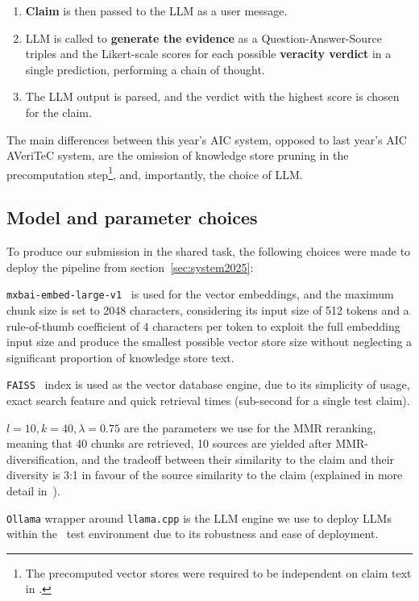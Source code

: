 \begin{enumerate}[i.]
\begin{enumerate}[1.]
        \item \textbf{Claim} is then passed to the LLM as a user message.
        \item LLM is called to \textbf{generate the evidence} as a Question-Answer-Source triples and the Likert-scale scores for each possible \textbf{veracity verdict} in a single prediction, performing a chain of thought. 
        \item The LLM output is parsed, and the verdict with the highest score is chosen for the claim.
    \end{enumerate}
\end{enumerate}

The main differences between this year's AIC \averitec{} system, opposed to last year's AIC AVeriTeC system, are the omission of knowledge store pruning in the precomputation step\footnote{The precomputed vector stores were required to be independent on claim text in \averitec{}.}, and, importantly, the choice of LLM.
\subsection{Model and parameter choices}
\label{sec:choices}
To produce our submission in the \averitec{} shared task, the following choices were made to deploy the pipeline from section~\ref{sec:system2025}:

\texttt{mxbai-embed-large-v1}~\cite{li-li-2024-aoe,emb2024mxbai} is used for the vector embeddings, and the maximum chunk size is set to 2048 characters, considering its input size of 512 tokens and a rule-of-thumb coefficient of 4 characters per token to exploit the full embedding input size and produce the smallest possible vector store size without neglecting a significant proportion of knowledge store text.

\texttt{FAISS}~\cite{douze2024faiss,johnson2019billion} index is used as the vector database engine, due to its simplicity of usage, exact search feature and quick retrieval times (sub-second for a single \averitec{} test claim).

$l=10, k=40, \lambda=0.75$ are the parameters we use for the MMR reranking, meaning that 40 chunks are retrieved, 10 sources are yielded after MMR-diversification, and the tradeoff between their similarity to the claim and their diversity is 3:1 in favour of the source similarity to the claim (explained in more detail in~\cite{ullrich-etal-2024-aic}). 

\texttt{Ollama} wrapper around \texttt{llama.cpp} is the LLM engine we use to deploy LLMs within the \averitec~test environment due to its robustness and ease of deployment.

